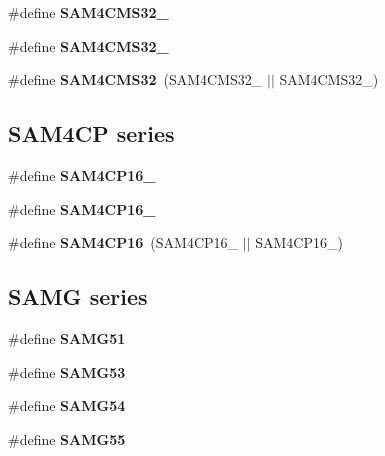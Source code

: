 \begin{DoxyCompactItemize}
\item 
\#define {\bfseries S\-A\-M4\-C\-M\-S32\-\_}
\item 
\#define {\bfseries S\-A\-M4\-C\-M\-S32\-\_}
\item 
\hypertarget{group__sam__part__macros__group_gaeb53c0522eaadff13c8ec90644ac8721}{\#define {\bfseries S\-A\-M4\-C\-M\-S32}~(S\-A\-M4\-C\-M\-S32\-\_ $|$$|$ S\-A\-M4\-C\-M\-S32\-\_)}\label{group__sam__part__macros__group_gaeb53c0522eaadff13c8ec90644ac8721}

\end{DoxyCompactItemize}
\subsection*{S\-A\-M4\-C\-P series}
\begin{DoxyCompactItemize}
\item 
\#define {\bfseries S\-A\-M4\-C\-P16\-\_}
\item 
\#define {\bfseries S\-A\-M4\-C\-P16\-\_}
\item 
\hypertarget{group__sam__part__macros__group_gafd1c94764b607ffb18e6a495e5486659}{\#define {\bfseries S\-A\-M4\-C\-P16}~(S\-A\-M4\-C\-P16\-\_ $|$$|$ S\-A\-M4\-C\-P16\-\_)}\label{group__sam__part__macros__group_gafd1c94764b607ffb18e6a495e5486659}

\end{DoxyCompactItemize}
\subsection*{S\-A\-M\-G series}
\begin{DoxyCompactItemize}
\item 
\#define {\bfseries S\-A\-M\-G51}
\item 
\#define {\bfseries S\-A\-M\-G53}
\item 
\#define {\bfseries S\-A\-M\-G54}
\item 
\#define {\bfseries S\-A\-M\-G55}
\end{DoxyCompactItemize}
